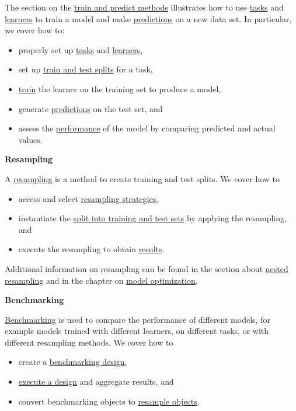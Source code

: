 \documentclass[
]{scrbook}
\providecommand{\tightlist}{%
  \setlength{\itemsep}{0pt}\setlength{\parskip}{0pt}}
\begin{document}
The section on the \protect\hyperlink{train-predict}{train and predict methods} illustrates how to use \protect\hyperlink{tasks}{tasks} and \protect\hyperlink{learners}{learners} to train a model and make \protect\hyperlink{predicting}{predictions} on a new data set.
In particular, we cover how to:

\begin{itemize}
\tightlist
\item
  properly set up \protect\hyperlink{train-predict-objects}{tasks} and \protect\hyperlink{train-predict-objects}{learners},
\item
  set up \protect\hyperlink{split-data}{train and test splits} for a task,
\item
  \protect\hyperlink{training}{train} the learner on the training set to produce a model,
\item
  generate \protect\hyperlink{predicting}{predictions} on the test set, and
\item
  assess the \protect\hyperlink{measure}{performance} of the model by comparing predicted and actual values.
\end{itemize}

\textbf{Resampling}

A \protect\hyperlink{resampling}{resampling} is a method to create training and test splits.
We cover how to

\begin{itemize}
\tightlist
\item
  access and select \protect\hyperlink{resampling-settings}{resampling strategies},
\item
  instantiate the \protect\hyperlink{resampling-inst}{split into training and test sets} by applying the resampling, and
\item
  execute the resampling to obtain \protect\hyperlink{resampling-exec}{results}.
\end{itemize}

Additional information on resampling can be found in the section about \protect\hyperlink{nested-resampling}{nested resampling} and in the chapter on \protect\hyperlink{optimization}{model optimization}.

\textbf{Benchmarking}

\protect\hyperlink{benchmarking}{Benchmarking} is used to compare the performance of different models, for example models trained with different learners, on different tasks, or with different resampling methods.
We cover how to

\begin{itemize}
\tightlist
\item
  create a \protect\hyperlink{bm-design}{benchmarking design},
\item
  \protect\hyperlink{bm-exec}{execute a design} and aggregate results, and
\item
  convert benchmarking objects to \protect\hyperlink{bm-resamp}{resample objects}.
\end{itemize}
\end{document}
